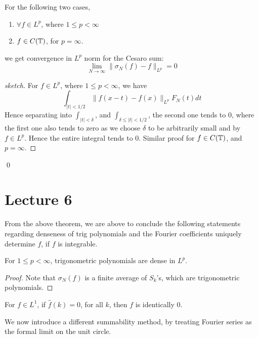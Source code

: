 \begin{theorem}
    For the following two cases,
    \begin{enumerate}
        \item $\forall f\in L^p$, where $1\leq p<\infty$
        \item $f\in C(\mathbb{T})$, for $p=\infty$.
    \end{enumerate}
    we get convergence in $L^p$ norm for the Cesaro sum:
    \begin{equation*}
        \lim_{N\to\infty}\|\sigma_N(f)-f\|_{L^p}=0
    \end{equation*}
\end{theorem}
\begin{proof}[sketch]
    For $f\in L^p$, where $1\leq p<\infty$, we have 
    \begin{equation*}
        \int_{|t|<1/2}\|f(x-t)-f(x)\|_{L^p}F_N(t)dt
    \end{equation*}
    Hence separating into $\int_{|t|<\delta}$, and $\int_{\delta\leq|t|<1/2}$, the second one tends to 0, where the first one also tends to zero as we choose $\delta$ to be arbitrarily small and by $f\in L^p$. Hence the entire integral tends to 0. Similar proof for $f\in C(\mathbb{T})$, and $p=\infty$.
\end{proof}
\qed

\section{Lecture 6}
From the above theorem, we are above to conclude the following statements regarding denseness of trig polynomials and the Fourier coefficients uniquely determine $f$, if $f$ is integrable.
\begin{corollary}
    For $1\leq p<\infty$, trigonometric polynomials are dense in $L^p$.
\end{corollary}
\begin{proof}
    Note that $\sigma_N(f)$ is a finite average of $S_k$'s, which are trigonometric polynomials.
\end{proof}

\begin{corollary}
    For $f\in L^1$, if $\widehat{f}(k)=0$, for all $k$, then $f$ is identically 0.
\end{corollary}

We now introduce a different summability method, by treating Fourier series as the formal limit on the unit circle.

\begin{comment}
    If you just try to make a text red, use \textcolor{color}{text}
\end{comment}

